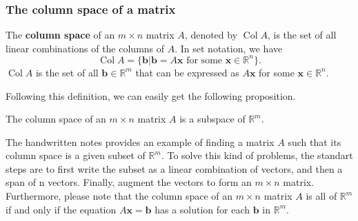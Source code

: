 \documentclass[10pt, a4paper]{article}
\newcommand{\R}{\mathbb{R}}
\begin{document}
\subsubsection*{The column space of a matrix}
\begin{definition}
    The \textbf{column space} of an $m\times n$ matrix $A$, denoted by $\operatorname*{Col}A$, is the set of all linear combinations of the columns of $A$. In set notation, we have $$
    \operatorname*{Col}A = \{\mathbf{b} | \mathbf{b} = A\mathbf{x} \text{ for some } \mathbf{x}\in\R^n\}.
    $$
    $\operatorname*{Col}A$ is the set of all $\mathbf{b}\in\R^m$ that can be expressed as $A\mathbf{x}$ for some $\mathbf{x}\in\R^n$.
\end{definition}
\indent Following this definition, we can easily get the following proposition.
\begin{proposition}
    The column space of an $m\times n$ matrix $A$ is a subspace of $\R^m$.
\end{proposition}
\indent The handwritten notes provides an example of finding a matrix $A$ such that its column space is a given subset of $\R^m$. To solve this kind of problems, the standart steps are to first write the subset as a linear combination of vectors, and then a span of n vectors. Finally, augment the vectors to form an $m\times n$ matrix.\\
Furthermore, please note that the column space of an $m \times n$ matrix $A$ is all of $\mathbb{R}^m$ if and only if the equation $A\mathbf{x} = \mathbf{b}$ has a solution for each $\mathbf{b}$ in $\mathbb{R}^m$.
\end{document}
